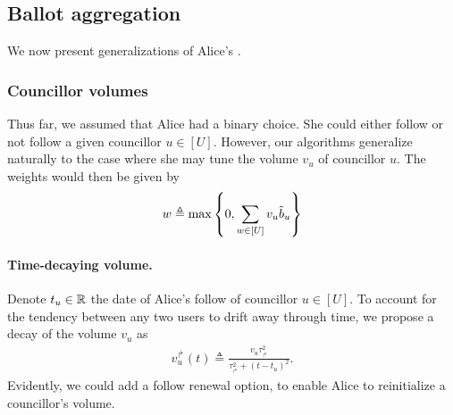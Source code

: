 \subsection{Ballot aggregation}
\label{sec:vote_generalization}

We now present generalizations of Alice's \Veche{}.

\subsubsection{Councillor volumes}

Thus far, we assumed that Alice had a binary choice.
She could either follow or not follow a given councillor $u \in [U]$.
However, our algorithms generalize naturally to 
the case where she may tune the volume $v_u$ of councillor $u$.
The weights would then be given by
\begin{align}
    w \triangleq \max \left\lbrace 0, \sum_{w \in [U]} v_u \tilde b_u \right\rbrace
\end{align}

\paragraph{Time-decaying volume.}
Denote $t_u \in \mathbb R$ the date of Alice's follow of councillor $u \in [U]$.
To account for the tendency between any two users to drift away through time,
we propose a decay of the volume $v_u$ as
\begin{align}
    v_u^{\Rsh} (t) \triangleq \frac{v_u \tau_{\Rsh}^2}{\tau_{\Rsh}^2 + (t - t_u)^2}.
\end{align}
Evidently, we could add a follow renewal option, 
to enable Alice to reinitialize a councillor's volume.

